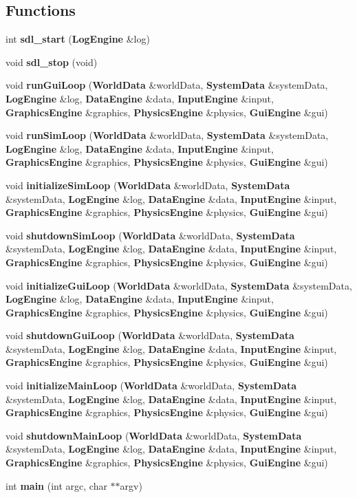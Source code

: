 \subsection*{Functions}
\begin{CompactItemize}
\item 
int {\bf sdl\_\-start} ({\bf Log\-Engine} \&log)
\item 
void {\bf sdl\_\-stop} (void)
\item 
void {\bf run\-Gui\-Loop} ({\bf World\-Data} \&world\-Data, {\bf System\-Data} \&system\-Data, {\bf Log\-Engine} \&log, {\bf Data\-Engine} \&data, {\bf Input\-Engine} \&input, {\bf Graphics\-Engine} \&graphics, {\bf Physics\-Engine} \&physics, {\bf Gui\-Engine} \&gui)
\item 
void {\bf run\-Sim\-Loop} ({\bf World\-Data} \&world\-Data, {\bf System\-Data} \&system\-Data, {\bf Log\-Engine} \&log, {\bf Data\-Engine} \&data, {\bf Input\-Engine} \&input, {\bf Graphics\-Engine} \&graphics, {\bf Physics\-Engine} \&physics, {\bf Gui\-Engine} \&gui)
\item 
void {\bf initialize\-Sim\-Loop} ({\bf World\-Data} \&world\-Data, {\bf System\-Data} \&system\-Data, {\bf Log\-Engine} \&log, {\bf Data\-Engine} \&data, {\bf Input\-Engine} \&input, {\bf Graphics\-Engine} \&graphics, {\bf Physics\-Engine} \&physics, {\bf Gui\-Engine} \&gui)
\item 
void {\bf shutdown\-Sim\-Loop} ({\bf World\-Data} \&world\-Data, {\bf System\-Data} \&system\-Data, {\bf Log\-Engine} \&log, {\bf Data\-Engine} \&data, {\bf Input\-Engine} \&input, {\bf Graphics\-Engine} \&graphics, {\bf Physics\-Engine} \&physics, {\bf Gui\-Engine} \&gui)
\item 
void {\bf initialize\-Gui\-Loop} ({\bf World\-Data} \&world\-Data, {\bf System\-Data} \&system\-Data, {\bf Log\-Engine} \&log, {\bf Data\-Engine} \&data, {\bf Input\-Engine} \&input, {\bf Graphics\-Engine} \&graphics, {\bf Physics\-Engine} \&physics, {\bf Gui\-Engine} \&gui)
\item 
void {\bf shutdown\-Gui\-Loop} ({\bf World\-Data} \&world\-Data, {\bf System\-Data} \&system\-Data, {\bf Log\-Engine} \&log, {\bf Data\-Engine} \&data, {\bf Input\-Engine} \&input, {\bf Graphics\-Engine} \&graphics, {\bf Physics\-Engine} \&physics, {\bf Gui\-Engine} \&gui)
\item 
void {\bf initialize\-Main\-Loop} ({\bf World\-Data} \&world\-Data, {\bf System\-Data} \&system\-Data, {\bf Log\-Engine} \&log, {\bf Data\-Engine} \&data, {\bf Input\-Engine} \&input, {\bf Graphics\-Engine} \&graphics, {\bf Physics\-Engine} \&physics, {\bf Gui\-Engine} \&gui)
\item 
void {\bf shutdown\-Main\-Loop} ({\bf World\-Data} \&world\-Data, {\bf System\-Data} \&system\-Data, {\bf Log\-Engine} \&log, {\bf Data\-Engine} \&data, {\bf Input\-Engine} \&input, {\bf Graphics\-Engine} \&graphics, {\bf Physics\-Engine} \&physics, {\bf Gui\-Engine} \&gui)
\item 
int {\bf main} (int argc, char $\ast$$\ast$argv)
\end{CompactItemize}



